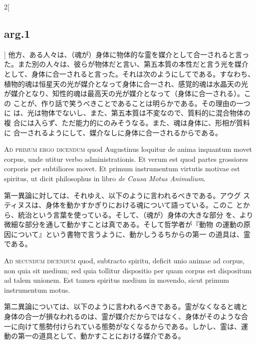 \documentclass[paper=a4paper,fontsize=10pt,jafontsize=9pt,titlepage]{jlreq}
\begin{document}
\begin{paracol}{2}[\subsection{arg.1}]
他方、ある人々は、（魂が）身体に物体的な霊を媒介として合一されると言っ
た。また別の人々は、彼らが物体だと言い、第五本質の本性だと言う光を媒介
として、身体に合一されると言った。それは次のようにしてである。すなわち、
植物的魂は恒星天の光が媒介となって身体に合一され、感覚的魂は水晶天の光
が媒介となり、知性的魂は最高天の光が媒介となって（身体に合一される）。この
ことが、作り話で笑うべきことであることは明らかである。その理由の一つに
は、光は物体でないし、また、第五本質は不変なので、質料的に混合物体の複
合には入らず、ただ能力的にのみそうなる。また、魂は身体に、形相が質料に
合一されるようにして、媒介なしに身体に合一されるからである。
 


\switchcolumn*[\subsection{ad 1}]



{\scshape Ad primum ergo dicendum} quod Augustinus loquitur de anima
inquantum movet corpus, unde utitur verbo administrationis. Et verum
est quod partes grossiores corporis per subtiliores movet. Et primum
instrumentum virtutis motivae est spiritus, ut dicit philosophus in
libro {\itshape de Causa Motus Animalium}.

\switchcolumn

 第一異論に対しては、それゆえ、以下のように言われるべきである。アウグ
 スティヌスは、身体を動かすかぎりにおける魂について語っている。このこ
 とから、統治という言葉を使っている。そして、（魂が）身体の大きな部分
 を、より微細な部分を通して動かすことは真である。そして哲学者が『動物
 の運動の原因について』という書物で言うように、動かしうるちからの第一
 の道具は、霊である。

\switchcolumn*[\subsection{ad 2}]



{\scshape Ad secundum dicendum} quod, subtracto spiritu, deficit unio
animae ad corpus, non quia sit medium; sed quia tollitur dispositio
per quam corpus est dispositum ad talem unionem. Est tamen spiritus
medium in movendo, sicut primum instrumentum motus.

\switchcolumn

第二異論については、以下のように言われるべきである。霊がなくなると魂と
身体の合一が損なわれるのは、霊が媒介だからではなく、身体がそのような合
一に向けて態勢付けられている態勢がなくなるからである。しかし、霊は、運
動の第一の道具として、動かすことにおける媒介である。


\end{paracol}
\end{document}
